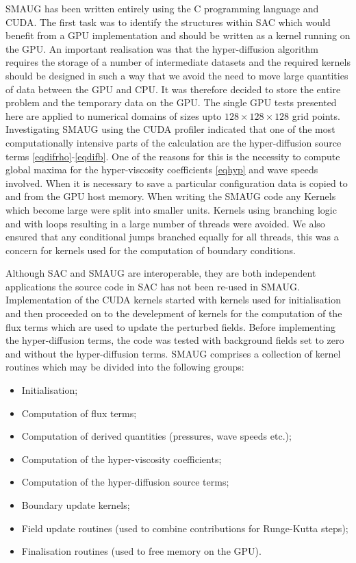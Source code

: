 \documentclass[final,1p]{elsarticle}
\begin{document}
 SMAUG has been written entirely using the C programming language and CUDA. The first task was to identify the structures within SAC which would benefit from a GPU implementation and should be written as a kernel running on the GPU. An important realisation was that the hyper-diffusion algorithm requires the storage of a number of intermediate datasets and the required kernels should be designed in such a way that we avoid the need to move large quantities of data between the GPU and CPU. It was therefore decided to store the entire problem and the temporary data on the GPU.  The single GPU tests presented here are applied to numerical domains of sizes upto   $128\times128\times128$ grid points.
 Investigating SMAUG using the CUDA profiler indicated that one of the most computationally intensive parts of the calculation are the hyper-diffusion source terms \eqref{eqdifrho}-\eqref{eqdifb}. One of the reasons for this is the necessity to compute global maxima for the hyper-viscosity coefficients \eqref{eqhyp} and wave speeds involved. When it is necessary to save a particular configuration data is copied to and from the GPU host memory. When writing the SMAUG code any Kernels which become large were split into smaller units. Kernels using branching logic and with loops resulting in a large number of threads were avoided. We also ensured that any conditional jumps branched equally for all threads, this was a concern for kernels used for the computation of boundary conditions.

 Although SAC and SMAUG are interoperable, they are both independent applications  the source code in SAC has not been re-used in SMAUG. Implementation of the CUDA kernels started  with kernels used for initialisation and then proceeded on to the develepment of kernels for the computation of the flux terms which are used to update the perturbed fields. Before implementing the hyper-diffusion terms, the code was tested with background fields set  to zero and without the hyper-diffusion terms.  SMAUG comprises a collection of kernel routines which may be divided into the following groups:
\begin{itemize}
\item    Initialisation;
\item    Computation of flux terms;
\item    Computation of derived quantities (pressures, wave speeds etc.);
\item    Computation of the hyper-viscosity coefficients;
\item    Computation of the hyper-diffusion source terms;
\item    Boundary update kernels;
\item    Field update routines (used to combine contributions for Runge-Kutta steps);
\item    Finalisation routines (used to free memory on the GPU).
\end{itemize}
\end{document}
